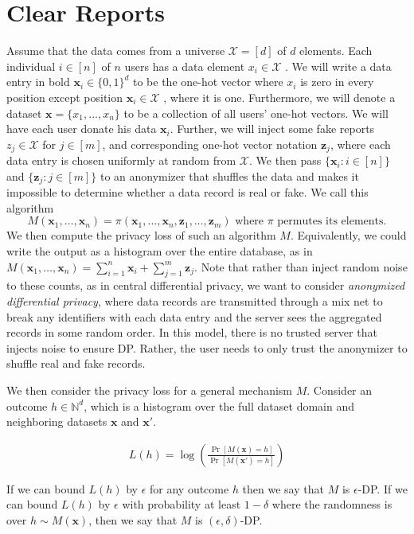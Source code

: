 \documentclass[11pt]{article}
\newcommand{\bbx}{\pmb{x}}
\newcommand{\bbz}{\pmb{z}}
\newcommand{\cX}{\mathcal{X}}
\newcommand{\N}{\mathbb{N}}
\begin{document}
\section{Clear Reports}

Assume that the data comes from a universe $\cX = [d]$ of $d$ elements. Each individual $i \in [n]$ of $n$ users has a data element $x_i\in \cX$ . We will write a data entry in bold $\bbx_i \in \{0, 1\}^d $ to be the one-hot vector where $x_i$ is zero in every position except position $\bbx_i \in \cX$ , where it is one. Furthermore, we will denote a dataset $\bbx = \{x_1,\dots ,x_n\}$ to be a collection of all users' one-hot vectors. We will have each user donate his data $\bbx_i$. Further, we will inject some fake reports $z_j\in \cX$ for $j \in [m]$, and corresponding one-hot vector notation $\bbz_j$, where each data entry is chosen uniformly at random from $\cX$. We then pass $\{\bbx_i : i \in [n]\}$ and $\{\bbz_j : j \in [m]\} $ to an anonymizer that shuffles the data and makes it impossible to determine whether a data record is real or fake. We call this algorithm 
\[
M(\bbx_1,  \dots , \bbx_n) = \pi (\bbx_1, \dots , \bbx_n, \bbz_1, \dots , \bbz_m) \text{ where } \pi \text{ permutes its elements}. 
\]
We then compute the privacy loss of such an algorithm $M$. Equivalently, we could write the output as a histogram over the entire database, as in $M(\bbx_1,  \dots , \bbx_n) = \sum^n_{i=1} \bbx_i + \sum^m_{j=1} \bbz_j$. Note that rather than inject random noise to these counts, as in central differential privacy, we want to consider \emph{anonymized differential privacy}, where data records are transmitted through a mix net to break any identifiers with each data entry and the server sees the aggregated records in some random order. In this model, there is no trusted server that injects noise to ensure DP. Rather, the user needs to only trust the anonymizer to shuffle real and fake records.

We then consider the privacy loss for a general mechanism $M$. Consider an outcome $h \in \N^d$, which is a histogram over the full dataset domain and neighboring datasets $\bbx$ and $\bbx'$.

\begin{align}
L(h) = \log \left ( \frac{\Pr[M(\bbx) = h]}{\Pr[M(\bbx') = h]} \right )
\end{align}

If we can bound $L(h)$ by $\epsilon$ for any outcome $h$ then we say that $M$ is $\epsilon$-DP. If we can bound $L(h)$ by $\epsilon$ with probability at least $1 - \delta$ where the randomness is over $h \sim M(\bbx)$, then we say that $M$ is $(\epsilon, \delta)$-DP.
\end{document}
